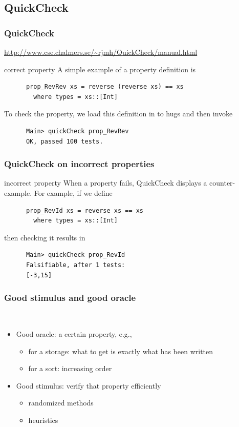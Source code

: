 \documentclass[lualatex]{beamer}
\begin{document}
\subsection{QuickCheck}

\begin{frame}[fragile]
  \frametitle{QuickCheck}

  \url{http://www.cse.chalmers.se/~rjmh/QuickCheck/manual.html}

  \begin{block}{correct property}
    A simple example of a property definition is
    \begin{verbatim}
      prop_RevRev xs = reverse (reverse xs) == xs
        where types = xs::[Int]
    \end{verbatim}
    To check the property, we load this definition in to hugs and then invoke
    \begin{verbatim}
      Main> quickCheck prop_RevRev
      OK, passed 100 tests.
    \end{verbatim}
  \end{block}
\end{frame}

\begin{frame}[fragile]
  \frametitle{QuickCheck on incorrect properties}

  \begin{block}{incorrect property}
    When a property fails, QuickCheck displays a counter-example.
    For example, if we define
    \begin{verbatim}
      prop_RevId xs = reverse xs == xs
        where types = xs::[Int]
    \end{verbatim}
    then checking it results in
    \begin{verbatim}
      Main> quickCheck prop_RevId
      Falsifiable, after 1 tests:
      [-3,15]
    \end{verbatim}
  \end{block}
\end{frame}

\begin{frame}
  \frametitle{Good stimulus and good oracle}

  \begin{block}{~}
    \begin{itemize}
    \item Good oracle: a certain property, e.g.,
      \begin{itemize}
      \item for a storage: what to get is exactly what has been written
      \item for a sort: increasing order
      \end{itemize}
    \item Good stimulus: verify that property efficiently
      \begin{itemize}
      \item randomized methods
      \item heuristics
      \end{itemize}
    \end{itemize}
  \end{block}
\end{frame}
\end{document}
